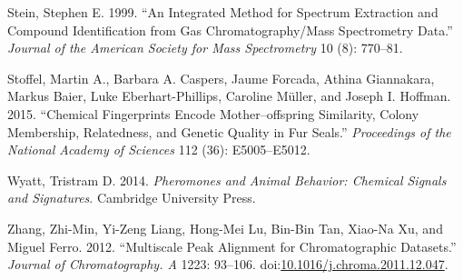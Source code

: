 \documentclass[]{article}
\begin{document}
\hypertarget{ref-Stein.1999}{}
Stein, Stephen E. 1999. ``An Integrated Method for Spectrum Extraction
and Compound Identification from Gas Chromatography/Mass Spectrometry
Data.'' \emph{Journal of the American Society for Mass Spectrometry} 10
(8): 770--81.

\hypertarget{ref-Stoffel.2015}{}
Stoffel, Martin A., Barbara A. Caspers, Jaume Forcada, Athina
Giannakara, Markus Baier, Luke Eberhart-Phillips, Caroline Müller, and
Joseph I. Hoffman. 2015. ``Chemical Fingerprints Encode
Mother--offspring Similarity, Colony Membership, Relatedness, and
Genetic Quality in Fur Seals.'' \emph{Proceedings of the National
Academy of Sciences} 112 (36): E5005--E5012.

\hypertarget{ref-Wyatt.2014}{}
Wyatt, Tristram D. 2014. \emph{Pheromones and Animal Behavior: Chemical
Signals and Signatures}. Cambridge University Press.

\hypertarget{ref-Zhang.2012}{}
Zhang, Zhi-Min, Yi-Zeng Liang, Hong-Mei Lu, Bin-Bin Tan, Xiao-Na Xu, and
Miguel Ferro. 2012. ``Multiscale Peak Alignment for Chromatographic
Datasets.'' \emph{Journal of Chromatography. A} 1223: 93--106.
doi:\href{https://doi.org/10.1016/j.chroma.2011.12.047}{10.1016/j.chroma.2011.12.047}.
\end{document}
